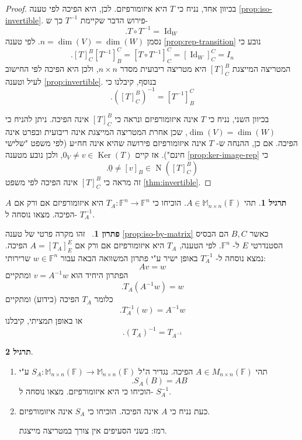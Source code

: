 \documentclass[12pt]{report}
\theoremstyle{plain}
\theoremstyle{definition}
\newtheorem{exercise}{תרגיל}[chapter]
\newtheorem*{solution}{פתרון}
\newcommand{\F}{\mathbb{F}}
\newcommand{\M}{\mathbb{M}}
\newcommand{\0}{\mathbf{0}}
\DeclareMathOperator{\Null}{N}
\DeclareMathOperator{\Ker}{Ker}
\DeclareMathOperator{\Id}{Id}
\begin{document}
\begin{proof}
בכיוון אחד, נניח כי 
$T$
היא איזומורפיזם. לכן, היא הפיכה לפי טענה 
\ref{prop:iso-invertible}.
פירוש הדבר שקיימת 
$T^{-1}$
כך ש-
$$
.T\circ T^{-1}=\Id_W
$$
נסמן
$n=\dim(V)=\dim(W)$.
לפי טענה
\ref{prop:rep-transition}
נובע כי
$$
.[T]_C^B[T^{-1}]_B^C=[T\circ T^{-1}]_C^C=[\Id_W]_C^C=I_{n}
$$
המטריצה המייצגת
$[T]_C^B$
היא מטריצה ריבועית מסדר 
$n\times n$,
ולכן היא הפיכה לפי החישוב לעיל וטענה 
\ref{prop:invertible}. 
בנוסף, קיבלנו כי
$$
.([T]_C^B)^{-1}=[T^{-1}]_B^C
$$

בכיוון השני, נניח כי
$T$
אינה איזומורפיזם ונראה כי
$[T]_C^B$
אינה הפיכה. ניתן להניח כי
$\dim(V)=\dim(W)$,
שכן אחרת המטריצה המייצגת אינה ריבועית ובפרט אינה הפיכה.
אם כן, ההנחה ש-
$T$
אינה איזומורפיזם פירושה שהיא אינה חח״ע (לפי משפט "שלישי חינם"). אז קיים
$0_V\neq v\in \Ker(T)$,
ולכן נובע מטענה
\ref{prop:ker-image-rep}
כי
$$
.\underline{0}\neq[v]_B\in \Null([T]_C^B)
$$
זה מראה כי
$[T]_C^B$
אינה הפיכה לפי משפט
\ref{thm:invertible}.
\end{proof}

\begin{exercise}
תהי
$A\in\M_{n\times n}(\F)$.
הוכיחו כי
$T_A:\F^n\to\F^n$
היא איזומורפיזם אם ורק אם 
$A$
הפיכה. מצאו נוסחה ל-
$T_A^{-1}$.

\end{exercise}

\begin{solution}\
זהו מקרה פרטי של טענה
\ref{prop:iso-by-matrix}
כאשר
$B,C$
הם הבסיס הסטנדרטי
$E$
ל-
$\F^n$.
לפי הטענה,
$T_A$
היא איזומורפיזם אם ורק אם 
$A=[T_A]_E^E$
הפיכה. נמצא נוסחה ל-
$T_A^{-1}$
באופן ישיר ע"י פתרון המשוואה הבאה עבור
$w\in\F^n$
שרירותי:
$$
Av=w
$$
הפתרון היחיד הוא 
$v=A^{-1}w$
ומתקיים
$$
.T_A(A^{-1}w)=w
$$
כלומר
$T_A$
הפיכה
(כידוע)
ומתקיים
$$
.T_A^{-1}(w)=A^{-1}w
$$
או באופן תמציתי, קיבלנו
$$
.(T_A)^{-1}=T_{A^{-1}}
$$
\end{solution}

\begin{exercise}\
\begin{enumerate}[label=\alph*.]
\item
תהי
$A\in M_{n\times n}(\F)$
הפיכה. נגדיר ה"ל
$S_A:\M_{n\times n}(\F)\to\M_{n\times n}(\F)$
ע"י
$$
.S_A(B)=AB
$$
הוכיחו כי היא איזומורפיזם. מצאו נוסחה ל-
$S_A^{-1}$.


\item
כעת נניח כי
$A$
אינה הפיכה. הוכיחו כי
$S_A$
אינה איזומורפיזם.

רמז: בשני הסעיפים אין צורך במטריצה מייצגת.


\end{enumerate}
\end{exercise}
\end{document}

